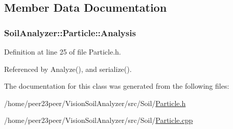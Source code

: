\subsection{Member Data Documentation}
\hypertarget{class_soil_analyzer_1_1_particle_a4df8d4d8fb130bce05fef5d4601ef89e}{}
\subsubsection[{Analysis}]{ Soil\+Analyzer\+::\+Particle\+::\+Analysis}\label{class_soil_analyzer_1_1_particle_a4df8d4d8fb130bce05fef5d4601ef89e}


Definition at line 25 of file Particle.\+h.



Referenced by Analyze(), and serialize().



The documentation for this class was generated from the following files\+:\begin{DoxyCompactItemize}
\item 
/home/peer23peer/\+Vision\+Soil\+Analyzer/src/\+Soil/\hyperlink{_particle_8h}{Particle.\+h}\item 
/home/peer23peer/\+Vision\+Soil\+Analyzer/src/\+Soil/\hyperlink{_particle_8cpp}{Particle.\+cpp}\end{DoxyCompactItemize}
